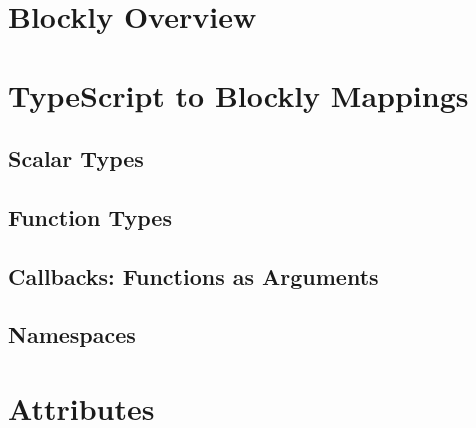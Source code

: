 \documentclass[sigplan,10pt]{acmart}
\begin{document}


\section{Blockly Overview}


\section{TypeScript to Blockly Mappings}



\subsection{Scalar Types}
\subsection{Function Types}
\subsection{Callbacks: Functions as Arguments}
\subsection{Namespaces}

\section{Attributes}

%

%
%
\end{document}
